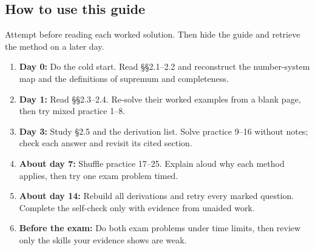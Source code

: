 \documentclass[11pt]{article}
\begin{document}
\begin{keepsection}
\section{How to use this guide}

Attempt before reading each worked solution. Then hide the guide and retrieve the method on a later day.

\begin{enumerate}
\item \textbf{Day 0:} Do the cold start. Read §§2.1–2.2 and reconstruct the number-system map and the definitions of supremum and completeness.
\item \textbf{Day 1:} Read §§2.3–2.4. Re-solve their worked examples from a blank page, then try mixed practice 1–8.
\item \textbf{Day 3:} Study §2.5 and the derivation list. Solve practice 9–16 without notes; check each answer and revisit its cited section.
\item \textbf{About day 7:} Shuffle practice 17–25. Explain aloud why each method applies, then try one exam problem timed.
\item \textbf{About day 14:} Rebuild all derivations and retry every marked question. Complete the self-check only with evidence from unaided work.
\item \textbf{Before the exam:} Do both exam problems under time limits, then review only the skills your evidence shows are weak.
\end{enumerate}
\end{keepsection}
\end{document}

